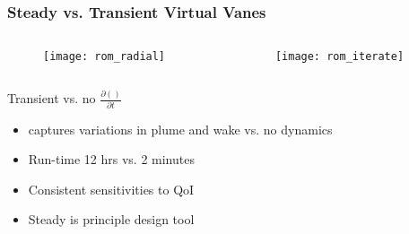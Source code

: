 \documentclass[mathserif]{beamer}
\begin{document}
%
%
\begin{frame}
 \frametitle{Steady vs. Transient Virtual Vanes}

 \begin{columns}[]
  \begin{column}{0.5\linewidth}

    \begin{figure}[htb]
     \centering
     \texttt{[image: rom\_radial]}
    \end{figure}

    \end{column}
  \begin{column}{0.5\linewidth}

    \begin{figure}[htb]
     \centering
     \texttt{[image: rom\_iterate]}
    \end{figure}

  \end{column}
 \end{columns}

 \begin{block}{Transient vs. no $\frac{\partial ()}{\partial t}$}
   \begin{itemize}
   \item captures variations in plume and wake vs. no dynamics
   \item Run-time 12 hrs vs. 2 minutes
   \item Consistent sensitivities to QoI	
   \item Steady is principle design tool
   \end{itemize}
 \end{block}
 
\end{frame}
\end{document}
